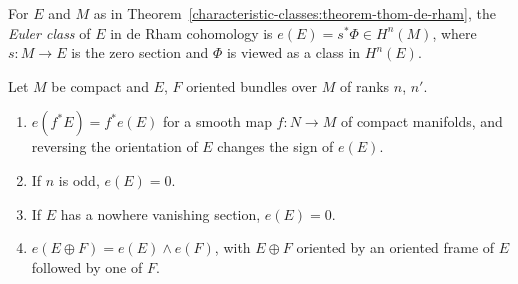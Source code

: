 \begin{definition}\label{characteristic-classes:definition-euler-de-rham}
For $E$ and $M$ as in Theorem~\ref{characteristic-classes:theorem-thom-de-rham}, the \emph{Euler class} of $E$ in de Rham cohomology is $e(E) = s^*\Phi \in H^n(M)$, where $s \colon M \to E$ is the zero section and $\Phi$ is viewed as a class in
$H^n(E)$.
\end{definition}

\begin{proposition}\label{characteristic-classes:proposition-euler-de-rham}
Let $M$ be compact and $E$, $F$ oriented bundles over $M$ of ranks $n$, $n'$.
\begin{enumerate}
\item $e(f^*E) = f^*e(E)$ for a smooth map $f \colon N \to M$ of compact manifolds, and reversing the orientation of $E$ changes the sign of $e(E)$.
\item If $n$ is odd, $e(E) = 0$.
\item If $E$ has a nowhere vanishing section, $e(E) = 0$.
\item $e(E \oplus F) = e(E) \wedge e(F)$, with $E \oplus F$ oriented by an oriented frame of $E$ followed by one of $F$.
\end{enumerate}
\end{proposition}

